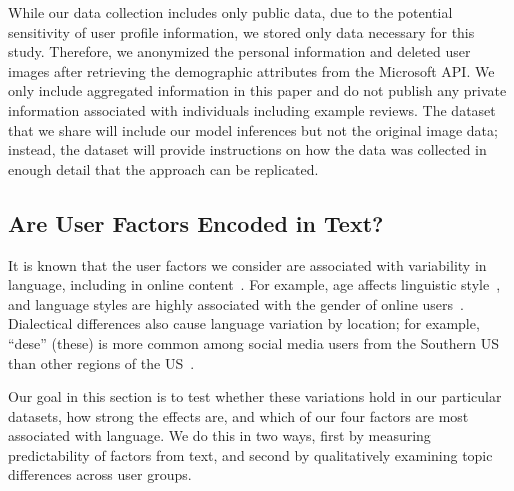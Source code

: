 While our data collection includes only public data, 
due to the potential sensitivity of user profile information,
we stored only data necessary for this study.
Therefore, we anonymized the personal information and deleted user images after retrieving the demographic attributes from the Microsoft API. We only include aggregated information in this paper and do not publish any private information associated with individuals including example reviews. 
The dataset that we share will include our model inferences but not the original image data; instead, the dataset will provide 
instructions on how the data was collected in enough detail that the approach can be replicated.


\subsection{Are User Factors Encoded in Text?}
\label{subsec:analysis}

It is known that the user factors we consider are associated with variability in language, including in online content~\cite{hovy2015demographic}.
For example, age affects linguistic style~\cite{wagner2012age},
and language styles are highly associated with the gender of online users~\cite{hovy2018capturing}.
Dialectical differences also cause language variation by location;
for example, ``dese'' (these) is more common among social media users from the Southern US than other regions of the US~\cite{goel2016social}.

Our goal in this section is to test
whether these variations hold in our particular datasets,
how strong the effects are,
and which of our four factors are most associated with language.
We do this in two ways,
first by measuring predictability of factors from text,
and second by qualitatively examining topic differences across user groups.


\begin{table}[t]
\centering
{}
\caption{Predictability of user factors from language data. We show the absolute percentage improvements in accuracy over majority-class baselines. For example, the majority-class baselines of accuracy scores are either .500 for the binary prediction or .250 for the region prediction.}
\label{table:explo}
\end{table}

